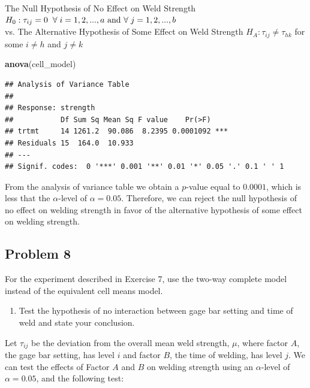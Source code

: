 \documentclass[12pt,]{article}
\newenvironment{Shaded}{\begin{snugshade}}{\end{snugshade}}
\newcommand{\KeywordTok}[1]{\textcolor[rgb]{0.13,0.29,0.53}{\textbf{#1}}}
\newcommand{\NormalTok}[1]{#1}
\providecommand{\tightlist}{%
  \setlength{\itemsep}{0pt}\setlength{\parskip}{0pt}}
\begin{document}
\begin{center}
 The Null Hypothesis of No Effect on Weld Strength  
 $H_0 : \tau_{ij} = 0 \hspace{.2cm }\forall \hspace{.1cm} i=1,2,...,a \text{ and }\forall  \hspace{.1cm} j=1,2,...,b$ \\
 vs. The Alternative Hypothesis of Some Effect on Weld Strength $H_A : \tau_{ij} \neq \tau_{hk}$ for some $i\neq h$ and $j\neq k$ 
\end{center}

\begin{Shaded}
\begin{Highlighting}[]
\KeywordTok{anova}\NormalTok{(cell_model)}
\end{Highlighting}
\end{Shaded}

\begin{verbatim}
## Analysis of Variance Table
## 
## Response: strength
##           Df Sum Sq Mean Sq F value    Pr(>F)    
## trtmt     14 1261.2  90.086  8.2395 0.0001092 ***
## Residuals 15  164.0  10.933                      
## ---
## Signif. codes:  0 '***' 0.001 '**' 0.01 '*' 0.05 '.' 0.1 ' ' 1
\end{verbatim}

From the analysis of variance table we obtain a \(p\)-value equal to
\(0.0001\), which is less that the \(\alpha\)-level of
\(\alpha = 0.05\). Therefore, we can reject the null hypothesis of no
effect on welding strength in favor of the alternative hypothesis of
some effect on welding strength.

\subsection{Problem 8}\label{problem-8}

For the experiment described in Exercise 7, use the two-way complete
model instead of the equivalent cell means model.

\begin{enumerate}
\def\labelenumi{(\alph{enumi})}
\tightlist
\item
  Test the hypothesis of no interaction between gage bar setting and
  time of weld and state your conclusion.
\end{enumerate}

Let \(\tau_{ij}\) be the deviation from the overall mean weld strength,
\(\mu\), where factor \(A\), the gage bar setting, has level \(i\) and
factor \(B\), the time of welding, has level \(j\). We can test the
effects of Factor \(A\) and \(B\) on welding strength using an
\(\alpha\)-level of \(\alpha = 0.05\), and the following test:
\end{document}

